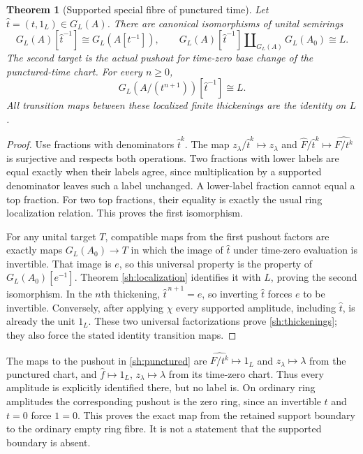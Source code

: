 \documentclass[11pt]{article}
\newtheorem{theorem}{Theorem}
\begin{document}
\begin{theorem}[Supported special fibre of punctured time]
\label{sh:puncture}
Let $\widehat t=(t,1_L)\in G_L(A)$. There are canonical
isomorphisms of unital semirings
\begin{equation}\tag{SH28}\label{sh:punctured}
 G_L(A)[\widehat t^{-1}]\cong G_L(A[t^{-1}]),\qquad
 G_L(A)[\widehat t^{-1}]
       \amalg_{G_L(A)}G_L(A_0)\cong L.
\end{equation}
The second target is the actual pushout for time-zero base
change of the punctured-time chart. For every $n\ge0$,
\begin{equation}\tag{SH29}\label{sh:thickenings}
 G_L(A/(t^{n+1}))[\widehat t^{-1}]\cong L.
\end{equation}
All transition maps between these localized finite thickenings
are the identity on $L$.
\end{theorem}
\begin{proof}
Use fractions with denominators $\widehat t^k$. The map
$z_\lambda/\widehat t^k\mapsto z_\lambda$ and
$\widehat F/\widehat t^k\mapsto\widehat{F/t^k}$
is surjective and respects both operations. Two fractions with
lower labels are equal exactly when their labels agree, since
multiplication by a supported denominator leaves such a label
unchanged. A lower-label fraction cannot equal a top fraction.
For two top fractions, their equality is exactly the usual ring
localization relation. This proves the first isomorphism.

For any unital target $T$, compatible maps from the first
pushout factors are exactly maps $G_L(A_0)\to T$ in which
the image of $\widehat t$ under time-zero evaluation is
invertible. That image is $e$, so this universal property is
the property of $G_L(A_0)[e^{-1}]$. Theorem
\ref{sh:localization} identifies it with $L$, proving the second
isomorphism. In the $n$th thickening,
$\widehat t^{\,n+1}=e$, so inverting $\widehat t$ forces
$e$ to be invertible. Conversely, after applying $\chi$ every
supported amplitude, including $\widehat t$, is already the
unit $1_L$. These two universal factorizations prove
\eqref{sh:thickenings}; they also force the stated identity
transition maps.
\end{proof}

The maps to the pushout in \eqref{sh:punctured} are
$\widehat{F/t^k}\mapsto1_L$ and
$z_\lambda\mapsto\lambda$ from the punctured chart, and
$\widehat f\mapsto1_L$, $z_\lambda\mapsto\lambda$ from its
time-zero chart. Thus every amplitude is explicitly identified
there, but no label is. On ordinary ring amplitudes the
corresponding pushout is the zero ring, since an invertible
$t$ and $t=0$ force $1=0$. This proves the exact map from
the retained support boundary to the ordinary empty ring fibre.
It is not a statement that the supported boundary is absent.
\end{document}
